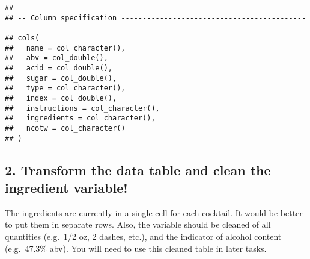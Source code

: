 \documentclass[
]{article}
\begin{document}
\begin{verbatim}
## 
## -- Column specification --------------------------------------------------------
## cols(
##   name = col_character(),
##   abv = col_double(),
##   acid = col_double(),
##   sugar = col_double(),
##   type = col_character(),
##   index = col_double(),
##   instructions = col_character(),
##   ingredients = col_character(),
##   ncotw = col_character()
## )
\end{verbatim}

\hypertarget{transform-the-data-table-and-clean-the-ingredient-variable}{%
\subsection{2. Transform the data table and clean the ingredient
variable!}\label{transform-the-data-table-and-clean-the-ingredient-variable}}

The ingredients are currently in a single cell for each cocktail. It
would be better to put them in separate rows. Also, the variable should
be cleaned of all quantities (e.g.~1/2 oz, 2 dashes, etc.), and the
indicator of alcohol content (e.g.~47.3\% abv). You will need to use
this cleaned table in later tasks.
\end{document}
